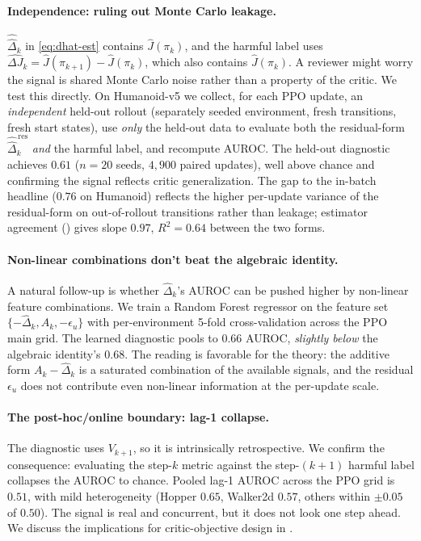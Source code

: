 \documentclass[11pt]{article}
\begin{document}
\paragraph{Independence: ruling out Monte Carlo leakage.}
$\widehat{\hat\Delta}_k$ in \cref{eq:dhat-est} contains $\widehat{J}(\pi_k)$, and the harmful label uses $\widehat{\Delta J}_k = \widehat{J}(\pi_{k+1}) - \widehat{J}(\pi_k)$, which also contains $\widehat{J}(\pi_k)$. A reviewer might worry the signal is shared Monte Carlo noise rather than a property of the critic. We test this directly. On Humanoid-v5 we collect, for each PPO update, an \emph{independent} held-out rollout (separately seeded environment, fresh transitions, fresh start states), use \emph{only} the held-out data to evaluate both the residual-form $\widehat{\hat\Delta}^{\,\mathrm{res}}_k$ \emph{and} the harmful label, and recompute AUROC. The held-out diagnostic achieves $0.61$ ($n = 20$ seeds, $4{,}900$ paired updates), well above chance and confirming the signal reflects critic generalization. The gap to the in-batch headline ($0.76$ on Humanoid) reflects the higher per-update variance of the residual-form on out-of-rollout transitions rather than leakage; estimator agreement () gives slope $0.97$, $R^2 = 0.64$ between the two forms.

\paragraph{Non-linear combinations don't beat the algebraic identity.}
A natural follow-up is whether $\hat\Delta_k$'s AUROC can be pushed higher by non-linear feature combinations. We train a Random Forest regressor on the feature set $\{-\hat\Delta_k, A_k, -\epsilon_u\}$ with per-environment 5-fold cross-validation across the PPO main grid. The learned diagnostic pools to $0.66$ AUROC, \emph{slightly below} the algebraic identity's $0.68$. The reading is favorable for the theory: the additive form $A_k - \hat\Delta_k$ is a saturated combination of the available signals, and the residual $\epsilon_u$ does not contribute even non-linear information at the per-update scale.

\paragraph{The post-hoc/online boundary: lag-1 collapse.}
The diagnostic uses $V_{k+1}$, so it is intrinsically retrospective. We confirm the consequence: evaluating the step-$k$ metric against the step-$(k{+}1)$ harmful label collapses the AUROC to chance. Pooled lag-1 AUROC across the PPO grid is $0.51$, with mild heterogeneity (Hopper $0.65$, Walker2d $0.57$, others within $\pm 0.05$ of $0.50$). The signal is real and concurrent, but it does not look one step ahead. We discuss the implications for critic-objective design in .
\end{document}

